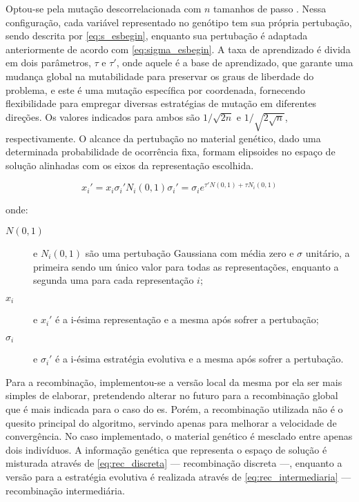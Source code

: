 Optou-se pela mutação descorrelacionada com $n$ tamanhos de passo
\cite[pp. 76--78]{eiben2003introduction}. Nessa configuração, cada
variável representado no genótipo tem sua própria pertubação, sendo
descrita por \ref{eq:s_esbegin}, enquanto sua pertubação é adaptada
anteriormente de acordo com \ref{eq:sigma_esbegin}. A taxa de
aprendizado é divida em dois parâmetros, $\tau$ e $\tau'$, onde aquele
é a base de aprendizado, que garante uma mudança global na
mutabilidade para preservar os graus de liberdade do problema, e este
é uma mutação específica por coordenada, fornecendo flexibilidade para
empregar diversas estratégias de mutação em diferentes direções. Os
valores indicados para ambos são $1/\sqrt{2n}$ e $1/\sqrt{2\sqrt{n}}$,
respectivamente. O alcance da pertubação no material genético, dado uma
determinada probabilidade de ocorrência fixa, formam elipsoides no
espaço de solução alinhadas com os eixos da representação escolhida.

\begin{subequations}
\begin{equation}\label{eq:s_esbegin}
x_i' = x_i\sigma_i'N_i(0,1)
\end{equation}
\begin{equation}\label{eq:sigma_esbegin}
\sigma_i' = \sigma_ie^{\tau'N(0,1)+\tau N_i(0,1)}
\end{equation}
\end{subequations}

\noindent onde:

\begin{description}
\item[$N(0,1)$] e $N_i(0,1)$ são uma pertubação Gaussiana com média
zero e $\sigma$ unitário, a primeira sendo um único valor para todas
as representações, enquanto a segunda uma para cada representação $i$;
\item[$x_i$] e $x_i'$ é a i-ésima representação e a mesma após sofrer a
pertubação;
\item[$\sigma_i$] e $\sigma_i'$ é a i-ésima estratégia evolutiva e a
mesma após sofrer a pertubação.
\end{description}

Para a recombinação, implementou-se a versão local da mesma por ela
ser mais simples de elaborar, pretendendo alterar no futuro para
a recombinação global que é mais indicada para o caso do \acs{es}.
Porém, a recombinação utilizada não é o quesito principal do
algoritmo, servindo apenas para melhorar a velocidade de convergência.
No caso implementado, o material genético é mesclado entre apenas
dois indivíduos. A informação genética que representa o espaço de
solução é misturada através de \ref{eq:rec_discreta} --- recombinação discreta
---, enquanto a versão para a estratégia evolutiva é realizada através
de \ref{eq:rec_intermediaria} --- recombinação intermediária.

